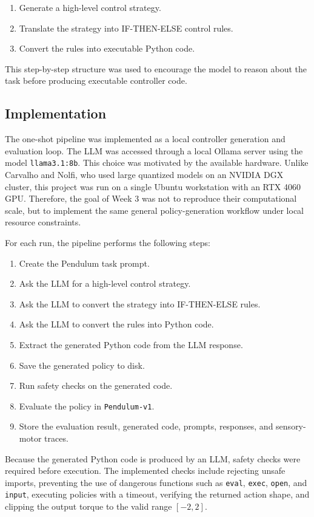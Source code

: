 \documentclass[11pt,a4paper]{article}
\begin{document}
\begin{enumerate}
\item Generate a high-level control strategy.
\item Translate the strategy into IF-THEN-ELSE control rules.
\item Convert the rules into executable Python code.
\end{enumerate}

This step-by-step structure was used to encourage the model to reason about the task before producing executable controller code.

\subsection{Implementation}

The one-shot pipeline was implemented as a local controller generation and evaluation loop. The LLM was accessed through a local Ollama server using the model \texttt{llama3.1:8b}. This choice was motivated by the available hardware. Unlike Carvalho and Nolfi, who used large quantized models on an NVIDIA DGX cluster, this project was run on a single Ubuntu workstation with an RTX 4060 GPU. Therefore, the goal of Week 3 was not to reproduce their computational scale, but to implement the same general policy-generation workflow under local resource constraints.

For each run, the pipeline performs the following steps:

\begin{enumerate}
\item Create the Pendulum task prompt.
\item Ask the LLM for a high-level control strategy.
\item Ask the LLM to convert the strategy into IF-THEN-ELSE rules.
\item Ask the LLM to convert the rules into Python code.
\item Extract the generated Python code from the LLM response.
\item Save the generated policy to disk.
\item Run safety checks on the generated code.
\item Evaluate the policy in \texttt{Pendulum-v1}.
\item Store the evaluation result, generated code, prompts, responses, and sensory-motor traces.
\end{enumerate}

Because the generated Python code is produced by an LLM, safety checks were required before execution. The implemented checks include rejecting unsafe imports, preventing the use of dangerous functions such as \texttt{eval}, \texttt{exec}, \texttt{open}, and \texttt{input}, executing policies with a timeout, verifying the returned action shape, and clipping the output torque to the valid range $[-2,2]$.
\end{document}
